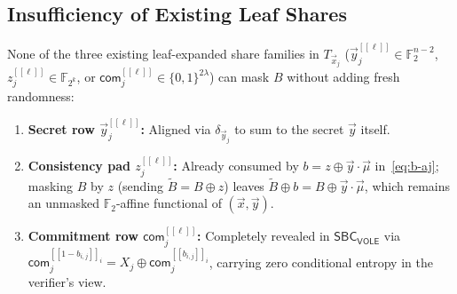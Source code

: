 \documentclass[11pt,a4paper]{article}
\theoremstyle{definition}
\theoremstyle{remark}
\newcommand{\Ftwo}{\mathbb{F}_2}
\newcommand{\Ftwok}{\mathbb{F}_{2^k}}
\newcommand{\SBCVOLE}{\mathsf{SBC}_{\mathsf{VOLE}}}
\newcommand{\com}{\mathsf{com}}
\newcommand{\share}[1]{[\![#1]\!]}
\begin{document}
\subsection{Insufficiency of Existing Leaf Shares}
None of the three existing leaf-expanded share families in $T_{\vec{x}_j}$ ($\vec{y}_j^{\share{\ell}} \in \Ftwo^{n-2}$, $z_j^{\share{\ell}} \in \Ftwok$, or $\com_j^{\share{\ell}} \in \{0,1\}^{2\lambda}$) can mask $B$ without adding fresh randomness:
\begin{enumerate}[leftmargin=2em]
    \item \textbf{Secret row $\vec{y}_j^{\share{\ell}}$:} Aligned via $\delta_{\vec{y}_j}$ to sum to the secret $\vec{y}$ itself.
    \item \textbf{Consistency pad $z_j^{\share{\ell}}$:} Already consumed by $b = z \oplus \vec{y} \cdot \vec{\mu}$ in~\eqref{eq:b-aj}; masking $B$ by $z$ (sending $\tilde{B} = B \oplus z$) leaves $\tilde{B} \oplus b = B \oplus \vec{y} \cdot \vec{\mu}$, which remains an unmasked $\Ftwo$-affine functional of $(\vec{x}, \vec{y})$.
    \item \textbf{Commitment row $\com_j^{\share{\ell}}$:} Completely revealed in $\SBCVOLE$ via $\com_j^{\share{1-b_{i,j}}_i} = X_j \oplus \com_j^{\share{b_{i,j}}_i}$, carrying zero conditional entropy in the verifier's view.
\end{enumerate}
\end{document}
